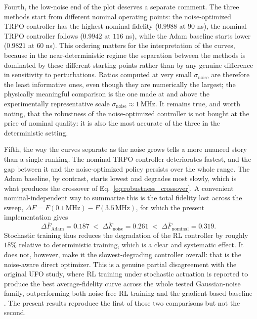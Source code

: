 Fourth, the low-noise end of the plot deserves a separate comment. The three methods start from different nominal
operating points: the noise-optimized TRPO controller has the highest nominal fidelity
($0.9988$ at $90$ ns), the nominal TRPO controller follows
($0.9942$ at $116$ ns), while the Adam baseline starts lower
($0.9821$ at $60$ ns).
This ordering matters for the interpretation of the curves, because in the near-deterministic regime the
separation between the methods is dominated by these different starting points rather than by any genuine
difference in sensitivity to perturbations. Ratios computed at very small $\sigma_{\mathrm{noise}}$ are therefore
the least informative ones, even though they are numerically the largest; the physically meaningful comparison is
the one made at and above the experimentally representative scale $\sigma_{\mathrm{noise}}\approx1\,\mathrm{MHz}$.
It remains true, and worth noting, that the robustness of the noise-optimized controller is not bought at the
price of nominal quality: it is also the most accurate of the three in the deterministic setting.

Fifth, the way the curves separate as the noise grows tells a more nuanced story than a single ranking. The
nominal TRPO controller deteriorates fastest, and the gap between it and the noise-optimized policy persists over
the whole range. The Adam baseline, by contrast, starts lowest and degrades most slowly, which is what produces
the crossover of Eq.~\eqref{eq:robustness_crossover}. A convenient nominal-independent way to summarize this is
the total fidelity lost across the sweep,
$\Delta\overline{F}=\overline{F}(0.1\,\mathrm{MHz})-\overline{F}(3.5\,\mathrm{MHz})$, for which the present
implementation gives
\begin{equation}
\Delta\overline{F}_{\mathrm{Adam}} = 0.187
\;<\;
\Delta\overline{F}_{\mathrm{noise}} = 0.261
\;<\;
\Delta\overline{F}_{\mathrm{nominal}} = 0.319 .
\label{eq:robustness_degradation}
\end{equation}
Stochastic training thus reduces the degradation of the RL controller by roughly $18\%$ relative to deterministic
training, which is a clear and systematic effect. It does not, however, make it the slowest-degrading controller
overall: that is the noise-aware direct optimizer. This is a genuine partial disagreement with the original UFO
study, where RL training under stochastic actuation is reported to produce the best average-fidelity curve across
the whole tested Gaussian-noise family, outperforming both noise-free RL training and the gradient-based baseline
\cite{Niu2019}. The present results reproduce the first of those two comparisons but not the second.

